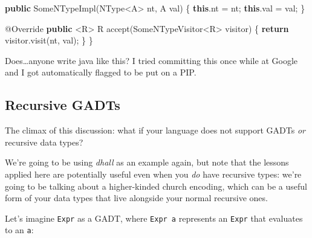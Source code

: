 \documentclass[]{article}
\newenvironment{Shaded}{}{}
\newcommand{\AttributeTok}[1]{\textcolor[rgb]{0.49,0.56,0.16}{#1}}
\newcommand{\ControlFlowTok}[1]{\textcolor[rgb]{0.00,0.44,0.13}{\textbf{#1}}}
\newcommand{\FunctionTok}[1]{\textcolor[rgb]{0.02,0.16,0.49}{#1}}
\newcommand{\KeywordTok}[1]{\textcolor[rgb]{0.00,0.44,0.13}{\textbf{#1}}}
\newcommand{\NormalTok}[1]{#1}
\newcommand{\OperatorTok}[1]{\textcolor[rgb]{0.40,0.40,0.40}{#1}}
\begin{document}
\begin{Shaded}
\begin{Highlighting}[]
    \KeywordTok{public} \FunctionTok{SomeNTypeImpl}\OperatorTok{(}\NormalTok{NType}\OperatorTok{\textless{}}\NormalTok{A}\OperatorTok{\textgreater{}}\NormalTok{ nt}\OperatorTok{,}\NormalTok{ A val}\OperatorTok{)} \OperatorTok{\{}
        \KeywordTok{this}\OperatorTok{.}\FunctionTok{nt} \OperatorTok{=}\NormalTok{ nt}\OperatorTok{;}
        \KeywordTok{this}\OperatorTok{.}\FunctionTok{val} \OperatorTok{=}\NormalTok{ val}\OperatorTok{;}
    \OperatorTok{\}}

    \AttributeTok{@Override}
    \KeywordTok{public} \OperatorTok{\textless{}}\NormalTok{R}\OperatorTok{\textgreater{}}\NormalTok{ R }\FunctionTok{accept}\OperatorTok{(}\NormalTok{SomeNTypeVisitor}\OperatorTok{\textless{}}\NormalTok{R}\OperatorTok{\textgreater{}}\NormalTok{ visitor}\OperatorTok{)} \OperatorTok{\{}
        \ControlFlowTok{return}\NormalTok{ visitor}\OperatorTok{.}\FunctionTok{visit}\OperatorTok{(}\NormalTok{nt}\OperatorTok{,}\NormalTok{ val}\OperatorTok{);}
    \OperatorTok{\}}
\OperatorTok{\}}
\end{Highlighting}
\end{Shaded}

Does\ldots anyone write java like this? I tried committing this once while at
Google and I got automatically flagged to be put on a PIP.

\subsection{Recursive GADTs}\label{recursive-gadts}

The climax of this discussion: what if your language does not support GADTs
\emph{or} recursive data types?

We're going to be using \emph{dhall} as an example again, but note that the
lessons applied here are potentially useful even when you \emph{do} have
recursive types: we're going to be talking about a higher-kinded church
encoding, which can be a useful form of your data types that live alongside your
normal recursive ones.

Let's imagine \texttt{Expr} as a GADT, where \texttt{Expr\ a} represents an
\texttt{Expr} that evaluates to an \texttt{a}:
\end{document}
